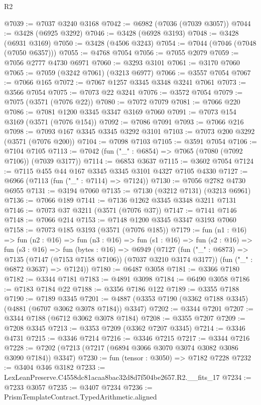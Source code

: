 \begin{lexlean}{R2}
\begin{coremodule}
@7039 := @7037 @3240 @3168
@7042 := @6982 (@7036 (@7039 @3057))
@7044 := @3428 (@6925 @3292)
@7046 := @3428 (@6928 @3193)
@7048 := @3428 (@6931 @3169)
@7050 := @3428 (@4506 @3243)
@7054 := @7044 (@7046 (@7048 (@7050 @6357)))
@7055 := @4768 @7054
@7056 := @7055 @2079
@7059 := @7056 @2777 @4730 @6971
@7060 := @3293 @3101
@7061 := @3170 @7060
@7065 := @7059 (@3242 @7061) (@3213 @6977)
@7066 := @3557 @7054
@7067 := @7066 @165
@7072 := @7067 @1257 @3345 @3348 @3241 @7061
@7073 := @3566 @7054
@7075 := @7073 @22 @3241
@7076 := @3572 @7054
@7079 := @7075 (@3571 (@7076 @22))
@7080 := @7072 @7079
@7081 := @7066 @220
@7086 := @7081 @1200 @3345 @3347 @3169 @7060
@7091 := @7073 @154 @3169 (@3571 (@7076 @154))
@7092 := @7086 @7091
@7093 := @7066 @216
@7098 := @7093 @167 @3345 @3345 @3292 @3101
@7103 := @7073 @200 @3292 (@3571 (@7076 @200))
@7104 := @7098 @7103
@7105 := @3591 @7054
@7106 := @7104 @7105
@7113 := @7042 (fun ("_" : @6854) => @7065 (@7080 (@7092 @7106)) (@7039 @3177))
@7114 := @6853 @3637
@7115 := @3602 @7054
@7124 := @7115 @455 @44 @167 @3345 @3345 @3101 @4327 @7105 @4330
@7127 := @6966 (@7113 (fun ("_" : @7114) => @7124))
@7130 := @7056 @2782 @4730 @6955
@7131 := @3194 @7060
@7135 := @7130 (@3212 @7131) (@3213 @6961)
@7136 := @7066 @189
@7141 := @7136 @1262 @3345 @3348 @3211 @7131
@7146 := @7073 @37 @3211 (@3571 (@7076 @37))
@7147 := @7141 @7146
@7148 := @7066 @214
@7153 := @7148 @1200 @3345 @3347 @3193 @7060
@7158 := @7073 @185 @3193 (@3571 (@7076 @185))
@7179 := fun (n1 : @16) =>
  fun (n2 : @16) =>
  fun (n3 : @16) =>
  fun (s1 : @16) =>
  fun (s2 : @16) =>
  fun (s3 : @16) =>
  fun (bytes : @16) =>
  @6949
    (@7127
      (fun ("_" : @6873) => @7135 (@7147 (@7153 @7158 @7106)) (@7037 @3210 @3174 @3177))
      (fun ("_" : @6872 @3637) => @7124))
@7180 := @6487 @3058
@7181 := @3366 @7180
@7182 := @3344 @7181
@7183 := @4891 @3098
@7184 := @6490 @3058
@7186 := @7183 @7184 @22
@7188 := @3356 @7186 @122
@7189 := @3355 @7188
@7190 := @7189 @3345
@7201 := @4887 (@3353 @7190 (@3362 @7188 @3345) (@4881 (@6707 @3062 @3078 @7184)) @3347)
@7202 := @3344 @7201
@7207 := @3344 @7188 (@6712 @3062 @3078 @7184)
@7208 := @3355 @7207
@7209 := @7208 @3345
@7213 := @3353 @7209 (@3362 @7207 @3345)
@7214 := @3346 @4731
@7215 := @3346 @7214
@7216 := @3346 @7215
@7217 := @3344 @7216
@7228 := @7202 (@7213 (@7217 (@6894 @3066 @3070 @3074 @3082 @3086 @3090 @7184)) @3347)
@7230 := fun (tensor : @3050) => @7182 @7228
@7232 := @3404 @346 @3182
@7233 := LexLeanPreserve.C4558dc81acaa8bac32d8d7f504be2657.R2.__fits_17
@7234 := @7233 @3057
@7235 := @3407 @7234
@7236 := PrismTemplateContract.TypedArithmetic.aligned

\end{coremodule}
\end{lexlean}
